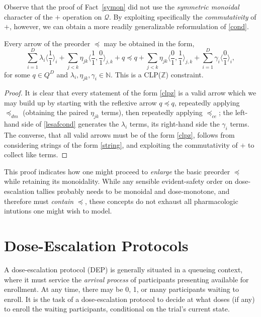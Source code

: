 \documentclass{article}
\newcommand{\N}{\mathbb{N}}
\newcommand{\Q}{\ensuremath{\mathcal{Q}}}
\begin{document}
Observe that the proof of Fact~\ref{symon} did not use the {\em symmetric monoidal} character of the $+$ operation on $\Q$.  By exploiting specifically the {\em commutativity} of $+$, however, we can obtain a more readily generalizable reformulation of \eqref{cond}.

\begin{fact}
  Every arrow of the preorder $\preceq$ may be obtained in the form,
  \begin{equation}
  \sum_{i=1}^D \lambda_i\langle\frac{1}{1}\rangle_i + \sum_{j<k} \eta_{jk}\langle\frac{1}{1},\frac{0}{1}\rangle_{j,k} +q \preceq q + \sum_{j<k} \eta_{jk}\langle\frac{0}{1},\frac{1}{1}\rangle_{j,k} + \sum_{i=1}^D \gamma_i\langle\frac{0}{1}\rangle_i, \label{clpz}
  \end{equation}
  for some $q \in Q^D$ and $\lambda_i, \eta_{jk}, \gamma_i \in \N$.  This is a CLP($\mathbb{Z}$) constraint.
\end{fact}
\begin{proof}
  It is clear that every statement of the form \eqref{clpz} is a valid arrow which we may build up by starting with the reflexive arrow $q \preceq q$, repeatedly applying $\preceq_{dm}$ (obtaining the paired $\eta_{jk}$ terms), then repeatedly applying $\preceq_{ce}$; the left-hand side of \eqref{lesafcond} generates the $\lambda_i$ terms, its right-hand side the $\gamma_i$ terms.
  The converse, that all valid arrows must be of the form \eqref{clpz}, follows from considering strings of the form \eqref{string}, and exploiting the commutativity of $+$ to collect like terms.
\end{proof}

This proof indicates how one might proceed to {\em enlarge} the basic preorder $\preceq$ while retaining its monoidality.  While any sensible evident-safety order on dose-escalation tallies probably needs to be monoidal and dose-monotone, and therefore must {\em contain} $\preceq$, these concepts do not exhaust all pharmacologic intutions one might wish to model.

\section{Dose-Escalation Protocols}

A dose-escalation protocol (DEP) is generally situated in a queueing context, where it must service the {\em arrival process} of participants presenting available for enrollment.  At any time, there may be 0, 1, or many participants waiting to enroll.  It is the task of a dose-escalation protocol to decide at what doses (if any) to enroll the waiting participants, conditional on the trial's current state.
\end{document}
